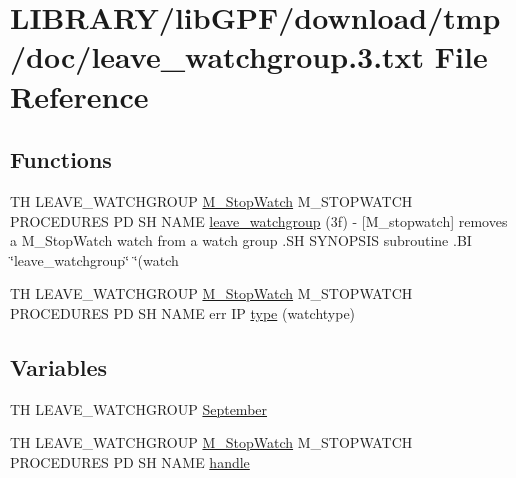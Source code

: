 \hypertarget{leave__watchgroup_83_8txt}{}\section{L\+I\+B\+R\+A\+R\+Y/lib\+G\+P\+F/download/tmp/doc/leave\+\_\+watchgroup.3.txt File Reference}
\label{leave__watchgroup_83_8txt}
\subsection*{Functions}
\begin{DoxyCompactItemize}
\item 
TH L\+E\+A\+V\+E\+\_\+\+W\+A\+T\+C\+H\+G\+R\+O\+UP \hyperlink{option__stopwatch_83_8txt_aa2011fc45a5e502e87ee50996a8a9305}{M\+\_\+\+Stop\+Watch} M\+\_\+\+S\+T\+O\+P\+W\+A\+T\+CH P\+R\+O\+C\+E\+D\+U\+R\+ES PD SH N\+A\+ME \hyperlink{leave__watchgroup_83_8txt_a430ff35f15204a9a4a68a5ae64e8ff98}{leave\+\_\+watchgroup} (3f) -\/ \mbox{[}\+M\+\_\+stopwatch\mbox{]} removes a M\+\_\+\+Stop\+Watch watch from a watch group .\+S\+H S\+Y\+N\+O\+P\+S\+I\+S subroutine .\+B\+I \char`\"{}leave\+\_\+watchgroup\char`\"{} \char`\"{}(watch
\item 
TH L\+E\+A\+V\+E\+\_\+\+W\+A\+T\+C\+H\+G\+R\+O\+UP \hyperlink{option__stopwatch_83_8txt_aa2011fc45a5e502e87ee50996a8a9305}{M\+\_\+\+Stop\+Watch} M\+\_\+\+S\+T\+O\+P\+W\+A\+T\+CH P\+R\+O\+C\+E\+D\+U\+R\+ES PD SH N\+A\+ME err IP \hyperlink{leave__watchgroup_83_8txt_afa66a982f4f99718b3217e7853d3d439}{type} (watchtype)
\end{DoxyCompactItemize}
\subsection*{Variables}
\begin{DoxyCompactItemize}
\item 
TH L\+E\+A\+V\+E\+\_\+\+W\+A\+T\+C\+H\+G\+R\+O\+UP \hyperlink{leave__watchgroup_83_8txt_a8e1188b87805533bd2487a085d0d7b3d}{September}
\item 
TH L\+E\+A\+V\+E\+\_\+\+W\+A\+T\+C\+H\+G\+R\+O\+UP \hyperlink{option__stopwatch_83_8txt_aa2011fc45a5e502e87ee50996a8a9305}{M\+\_\+\+Stop\+Watch} M\+\_\+\+S\+T\+O\+P\+W\+A\+T\+CH P\+R\+O\+C\+E\+D\+U\+R\+ES PD SH N\+A\+ME \hyperlink{leave__watchgroup_83_8txt_ad6c5ebd26f707ef8da754021612a7c8d}{handle}
\end{DoxyCompactItemize}


